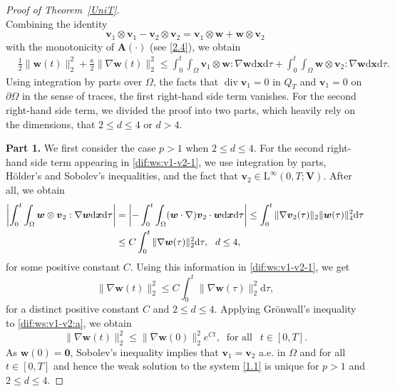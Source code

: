 \documentclass[12pt,reqno]{amsart}
\numberwithin{equation}{section}
\let\originalleft\left
\let\originalright\right
\renewcommand{\left}{\mathopen{}\mathclose\bgroup\originalleft}
\renewcommand{\right}{\aftergroup\egroup\originalright}
\theoremstyle{definition}
\def\d{\mathrm{d}}
\def\div{\operatorname{div}}
\def\L{\mathrm{L}}
\def\vv{\boldsymbol{v}}
\def\w{\boldsymbol{w}}
\def\x{\boldsymbol{x}}
\def\bfV{\mathbf{V}}
\def\bfA{\mathbf{A}}
\begin{document}
{{\begin{proof}[Proof of Theorem~\ref{UniT}]
\\
Combining the identity
\begin{equation*}
\vv_1\otimes\vv_1-\vv_2\otimes\vv_2= \vv_1\otimes\w + \w\otimes\vv_2
\end{equation*}
with the  monotonicity of $\bfA(\cdot)$ (see \eqref{2.4}), we obtain
\begin{equation}\label{dif:ws:v1-v2-1}
\begin{split}
& \frac{1}{2}\|\w(t)\|_{2}^2 + \frac{\kappa}{2}\|\nabla \w(t)\|_{2}^2 \leq
\int_0^t\!\!\int_\Omega \vv_1\otimes\w:\mathds{\nabla}\w\d\x\d\tau  + \int_0^t\!\!\int_\Omega \w\otimes\vv_2:\mathds{\nabla}\w\d\x\d\tau .
\end{split}
\end{equation}
Using integration by parts over $\Omega$, the facts that $\div\vv_1=0$ in $Q_T$ and $\vv_1=0$ on $\partial\Omega$ in the sense of traces, the first right-hand side term vanishes.
For the second right-hand side term, we divided the proof into two parts, which heavily rely on the dimensions, that $2\leq d \leq 4$ or $d>4$.

\vspace{2mm}
\noindent
\textbf{Part 1.} We first consider the case $p>1$ when $2\leq d  \leq 4$.
 For the second right-hand side term appearing in \eqref{dif:ws:v1-v2-1}, we use integration by parts, H\"older's and Sobolev's inequalities, and the fact that $\boldsymbol{v}_2\in\L^\infty(0,T;\bfV)$.
After all, we obtain
\begin{equation*}
\begin{split}
\left|\int_0^t \int_\Omega \boldsymbol{w} \otimes \boldsymbol{v}_2 : \nabla \boldsymbol{w}\d\x\d\tau\right| & =
\left|-\int_0^t \int_\Omega (\boldsymbol{w}\cdot\nabla)\boldsymbol{v}_2\cdot\boldsymbol{w}\d\x\d\tau \right|\leq
 \int_0^t \|\nabla\boldsymbol{v}_2(\tau) \|_2 \|\boldsymbol{w}(\tau) \|_4^2 \d\tau \\
& \leq  C\int_0^t \|\nabla\boldsymbol{w}(\tau) \|_2^2 \d\tau, \ \  d\leq 4,
\end{split}
\end{equation*}
for some positive constant $C$.
Using this information in \eqref{dif:ws:v1-v2-1}, we get
\begin{equation}\label{dif:ws:v1-v2:a}
\|\nabla \w(t)\|_{2}^2 \leq C\int_0^t \|\nabla\boldsymbol{w}(\tau) \|_2^2 \d\tau,
\end{equation}
for a distinct positive constant $C$ and $2\leq d\leq 4$.
Applying Gr\"onwall's inequality to \eqref{dif:ws:v1-v2:a}, we obtain
\begin{equation*}
	\|\nabla \w(t)\|_2^2 \leq \|\nabla \w(0)\|_2^2 e^{Ct},\ \text{ for all }\ \ t\in[0,T].
\end{equation*}
As $\w(0)=\boldsymbol{0}$, Sobolev's inequality implies that $\vv_1=\vv_2$ a.e. in $\Omega$ and for all $t\in [0,T]$ and hence the weak solution to the system \eqref{1.1} is unique for $p>1$ and $2\leq d\leq 4$.



\end{proof}}}
\end{document}
